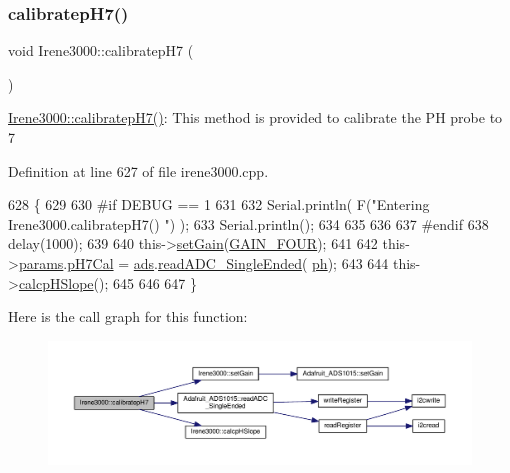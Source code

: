 \subsubsection{\texorpdfstring{calibratep\+H7()}{calibratepH7()}}
{\footnotesize\ttfamily void Irene3000\+::calibratep\+H7 (\begin{DoxyParamCaption}{ }\end{DoxyParamCaption})}

\hyperlink{class_irene3000_a1d3299202e4cb7afcff9c9e3e95d94c1}{Irene3000\+::calibratep\+H7()}\+: This method is provided to calibrate the PH probe to 7 

Definition at line 627 of file irene3000.\+cpp.


\begin{DoxyCode}
628 \{
629 
630 \textcolor{preprocessor}{#if DEBUG == 1 }
631 
632     Serial.println( F(\textcolor{stringliteral}{"Entering Irene3000.calibratepH7() "}) );
633     Serial.println();
634     
635     
636 
637 \textcolor{preprocessor}{#endif }
638     delay(1000);
639 
640     this->\hyperlink{class_irene3000_aff7c5da186b388e7272e63ff88a20c34}{setGain}(\hyperlink{_cool_adafruit___a_d_s1015_8h_a3d6c0e15829a207b9155890811fa4781a33fa5521f4e806b7438052fcdbbf8660}{GAIN\_FOUR});
641         
642     this->\hyperlink{class_irene3000_a136585a5ee7f9ac6ab52175fa153f8e3}{params}.\hyperlink{struct_irene3000_1_1parameters___t_a21265466a570d84bff914f26d2f7a03e}{pH7Cal} = \hyperlink{class_irene3000_a1215e77ba761c9908d80d691f149e135}{ads}.\hyperlink{class_adafruit___a_d_s1015_a40f38b9e1f3ec397c0670dd632510235}{readADC\_SingleEnded}(
      \hyperlink{_irene3000_8h_af771ceafe0e6524dd8497d4305dfe778}{ph});
643  
644     this->\hyperlink{class_irene3000_a81f6a79e546679692053f7ac1af49613}{calcpHSlope}();
645 
646 
647 \}
\end{DoxyCode}
Here is the call graph for this function\+:\nopagebreak
\begin{figure}[H]
\begin{center}
\leavevmode
\includegraphics[width=350pt]{d6/d03/class_irene3000_a1d3299202e4cb7afcff9c9e3e95d94c1_cgraph}
\end{center}
\end{figure}
